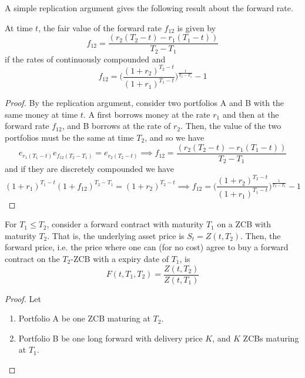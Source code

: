 \documentclass{article}
\begin{document}
  A simple replication argument gives the following result about the forward rate. 

  \begin{theorem}
    At time $t$, the fair value of the forward rate $f_{12}$ is given by 
    \begin{equation}
      f_{12} = \frac{(r_2 (T_2 - t) - r_1 (T_1 - t))}{T_2 - T_1}
    \end{equation}
    if the rates of continuously compounded and 
    \begin{equation}
      f_{12} = \bigg( \frac{(1 + r_2)^{T_2 - t}}{(1 + r_1)^{T_1 - t}} \bigg)^{\frac{1}{T_2 - T_1}} - 1 
    \end{equation}
  \end{theorem}
  \begin{proof}
    By the replication argument, consider two portfolios A and B with the same money at time $t$. A first borrows money at the rate $r_1$ and then at the forward rate $f_{12}$, and B borrows at the rate of $r_2$. Then, the value of the two portfolios must be the same at time $T_2$, and so we have 
    \begin{equation}
      e_{r_1(T_1 - t)} e_{f_{12}(T_2 - T_1)} = e_{r_2(T_2 - t)} \implies f_{12} = \frac{(r_2 (T_2 - t) - r_1 (T_1 - t))}{T_2 - T_1}
    \end{equation}
    and if they are discretely compounded we have 
    \begin{equation}
      (1 + r_1)^{T_1 - t} (1 + f_{12})^{T_2 - T_1} = (1 + r_2)^{T_2 - t} \implies f_{12} = \bigg( \frac{(1 + r_2)^{T_2 - t}}{(1 + r_1)^{T_1 - t}} \bigg)^{\frac{1}{T_2 - T_1}} - 1
    \end{equation}
  \end{proof}

  \begin{theorem}
    For $T_1 \leq T_2$, consider a forward contract with maturity $T_1$ on a ZCB with maturity $T_2$. That is, the underlying asset price is $S_t = Z(t, T_2)$. Then, the forward price, i.e. the price where one can (for no cost) agree to buy a forward contract on the $T_2$-ZCB with a expiry date of $T_1$, is 
    \begin{equation}
      F(t, T_1, T_2) = \frac{Z(t, T_2)}{Z(t, T_1)}
    \end{equation}
  \end{theorem}
  \begin{proof}
    Let 
    \begin{enumerate}
      \item Portfolio A be one ZCB maturing at $T_2$. 
      \item Portfolio B be one long forward with delivery price $K$, and $K$ ZCBs maturing at $T_1$. 
    \end{enumerate}
  \end{proof}
\end{document}
